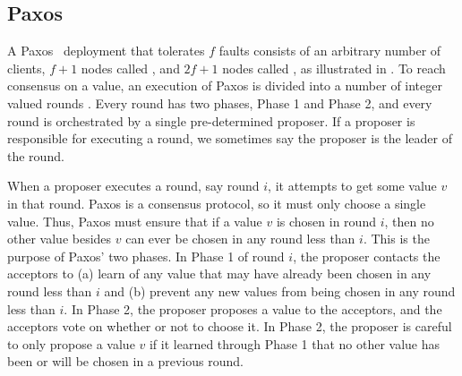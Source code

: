 \subsection{Paxos}
A Paxos~\cite{lamport1998part} deployment that tolerates $f$ faults consists of
an arbitrary number of clients, $f+1$ nodes called , and
$2f+1$ nodes called , as illustrated in .
%
To reach consensus on a value, an execution of Paxos is divided into a number
%
of integer valued rounds . Every round has two phases, Phase 1 and
Phase 2, and every round is orchestrated by a single pre-determined proposer.
%
%
If a proposer is responsible for executing a round, we sometimes say the
proposer is the leader of the round.

{}

When a proposer executes a round, say round $i$, it attempts to get some value
%
$v$  in that round.  Paxos is a
consensus protocol, so it must only choose a single value. Thus, Paxos must
ensure that if a value $v$ is chosen in round $i$, then no other value besides
$v$ can ever be chosen in any round less than $i$. This is the purpose of
Paxos' two phases. In Phase 1 of round $i$, the proposer contacts the acceptors
to (a) learn of any value that may have already been chosen in any round less
than $i$ and (b) prevent any new values from being chosen in any round less
than $i$. In Phase 2, the proposer proposes a value to the acceptors, and the
acceptors vote on whether or not to choose it.  In Phase 2, the proposer is
careful to only propose a value $v$ if it learned through Phase 1 that no other
value has been or will be chosen in a previous round.

